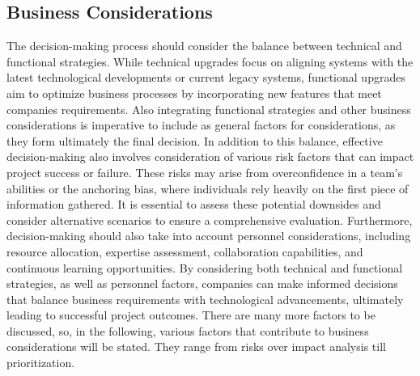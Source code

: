 \subsection{Business Considerations}
 The decision-making process should consider the balance between technical and functional strategies. While technical upgrades focus on aligning systems with the latest technological developments or current legacy systems, functional upgrades aim to optimize business processes by incorporating new features that meet companies requirements. Also integrating functional strategies and other business considerations is imperative to include as general factors for considerations, as they form ultimately the final decision. 
 \newline \noindent In addition to this balance, effective decision-making also involves consideration of various risk factors that can impact project success or failure. These risks may arise from overconfidence in a team's abilities or the anchoring bias, where individuals rely heavily on the first piece of information gathered. It is essential to assess these potential downsides and consider alternative scenarios to ensure a comprehensive evaluation.
 \newline \noindent Furthermore, decision-making should also take into account personnel considerations, including resource allocation, expertise assessment, collaboration capabilities, and continuous learning opportunities. By considering both technical and functional strategies, as well as personnel factors, companies can make informed decisions that balance business requirements with technological advancements, ultimately leading to successful project outcomes.
 \newline \noindent There are many more factors to be discussed, so, in the following, various factors that contribute to business considerations will be stated. They range from risks over impact analysis till prioritization. 

